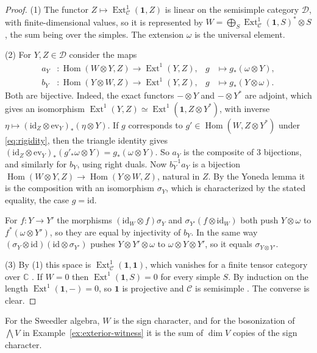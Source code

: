\documentclass[11pt,reqno]{amsart}
\theoremstyle{definition}
\newcommand{\Hom}{\operatorname{Hom}}
\newcommand{\Ext}{\operatorname{Ext}}
\newcommand{\one}{\mathbf 1}
\newcommand{\C}{\mathcal C}
\newcommand{\CC}{\mathbb C}
\begin{document}
\begin{proof}
(1) The functor $Z\mapsto\Ext^1_\C(\one,Z)$ is linear on the semisimple category $\mathcal D$, with finite-dimensional values, so it is represented by $W=\bigoplus_S\Ext^1_\C(\one,S)^*\otimes S$, the sum being over the simples. The extension $\omega$ is the universal element.

(2) For $Y,Z\in\mathcal D$ consider the maps
\begin{align*}
 a_Y&:\Hom(W\otimes Y,Z)\to\Ext^1(Y,Z),& g&\mapsto g_*(\omega\otimes Y),\\
 b_Y&:\Hom(Y\otimes W,Z)\to\Ext^1(Y,Z),& g&\mapsto g_*(Y\otimes\omega).
\end{align*}
Both are bijective. Indeed, the exact functors $-\otimes Y$ and $-\otimes Y^*$ are adjoint, which gives an isomorphism $\Ext^1(Y,Z)\simeq\Ext^1(\one,Z\otimes Y^*)$, with inverse $\eta\mapsto(\mathrm{id}_Z\otimes\mathrm{ev}_Y)_*(\eta\otimes Y)$. If $g$ corresponds to $g'\in\Hom(W,Z\otimes Y^*)$ under \eqref{eq:rigidity}, then the triangle identity gives $(\mathrm{id}_Z\otimes\mathrm{ev}_Y)_*(g'_*\omega\otimes Y)=g_*(\omega\otimes Y)$. So $a_Y$ is the composite of 3 bijections, and similarly for $b_Y$, using right duals. Now $b_Y^{-1}a_Y$ is a bijection $\Hom(W\otimes Y,Z)\to\Hom(Y\otimes W,Z)$, natural in $Z$. By the Yoneda lemma it is the composition with an isomorphism $\sigma_Y$, which is characterized by the stated equality, the case $g=\mathrm{id}$.

For $f:Y\to Y'$ the morphisms $(\mathrm{id}_W\otimes f)\sigma_Y$ and $\sigma_{Y'}(f\otimes\mathrm{id}_W)$ both push $Y\otimes\omega$ to $f^*(\omega\otimes Y')$, so they are equal by injectivity of $b_Y$. In the same way $(\sigma_Y\otimes\mathrm{id})(\mathrm{id}\otimes\sigma_{Y'})$ pushes $Y\otimes Y'\otimes\omega$ to $\omega\otimes Y\otimes Y'$, so it equals $\sigma_{Y\otimes Y'}$.

(3) By (1) this space is $\Ext^1_\C(\one,\one)$, which vanishes for a finite tensor category over $\CC$ \cite[Theorem~4.4.1]{EGNO}. If $W=0$ then $\Ext^1(\one,S)=0$ for every simple $S$. By induction on the length $\Ext^1(\one,-)=0$, so $\one$ is projective and $\C$ is semisimple \cite[Corollary~4.2.13]{EGNO}. The converse is clear.
\end{proof}

For the Sweedler algebra, $W$ is the sign character, and for the bosonization of $\bigwedge V$ in Example~\ref{ex:exterior-witness} it is the sum of $\dim V$ copies of the sign character.
\end{document}
